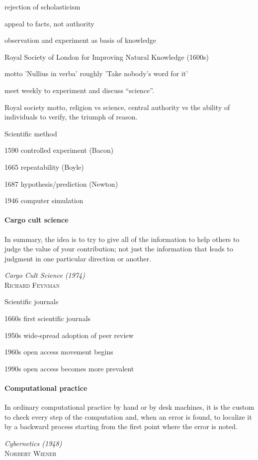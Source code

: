 \documentclass[ChapterTOCs,krantz2]{krantz} %
\begin{document}
rejection of scholasticism

appeal to facts, not authority

observation and experiment as basis of knowledge

Royal Society of London for Improving Natural Knowledge (1600s)

motto 'Nullius in verba' roughly 'Take nobody's word for it'

meet weekly to experiment and discuss ``science''. 

Royal society motto, religion vs science, central authority vs the
ability of individuals to verify, the triumph of reason.

Scientific method

1590  controlled experiment (Bacon)

1665  repeatability (Boyle)

1687  hypothesis/prediction (Newton)

1946  computer simulation


\paragraph{ {\bf Cargo cult science}}

\setlength{\epigraphrule}{0pt}
\setlength{\epigraphwidth}{.65\textwidth}
\epigraph%
{%
  In summary, the idea is to try to give all of the information to
  help others to judge the value of your contribution; not just the
  information that leads to judgment in one particular direction or
  another.
}%
{\textit{Cargo Cult Science (1974)}\\ \textsc{Richard Feynman} }

Scientific journals

1660s  first scientific journals

1950s  wide-spread adoption of peer review

1960s  open access movement begins

1990s  open access becomes more prevalent


\paragraph{ {\bf Computational practice}}

\setlength{\epigraphrule}{0pt}
\setlength{\epigraphwidth}{.65\textwidth}
\epigraph%
{%
  In ordinary computational practice by hand or by desk machines, it
  is the custom to check every step of the computation and, when an
  error is found, to localize it by a backward process starting from
  the first point where the error is noted.
}%
{\textit{Cybernetics (1948)}\\ \textsc{Norbert Wiener} }
\end{document}
